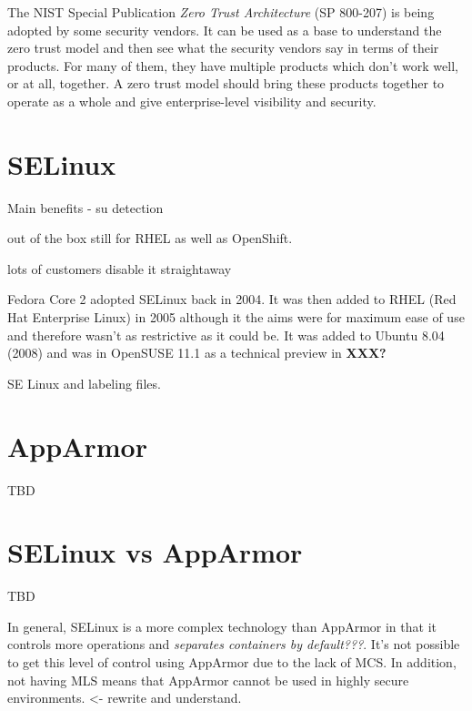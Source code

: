 The NIST Special Publication \textit{Zero Trust Architecture} (SP 800-207) is being adopted by some security vendors. It can be used as a base to understand the zero trust model and then see what the security vendors say in terms of their products. For many of them, they have multiple products which don't work well, or at all, together. A zero trust model should bring these products together to operate as a whole and give enterprise-level visibility and security.

\section{SELinux}\label{selinux}

Main benefits - su detection

out of the box still for RHEL as well as OpenShift.

lots of customers disable it straightaway 

Fedora Core 2 adopted SELinux back in 2004. It was then added to RHEL (Red Hat Enterprise Linux) in 2005 although it the aims were for maximum ease of use and therefore wasn't as restrictive as it could be. It was added to Ubuntu 8.04 (2008) and was in OpenSUSE 11.1 as a technical preview in \textbf{XXX?}

SE Linux and labeling files.


\section{AppArmor}

TBD

\section{SELinux vs AppArmor}

TBD



In general, SELinux is a more complex technology than AppArmor in that it controls more operations and \textit{separates containers by default???}. It's not possible to get this level of control using AppArmor due to the lack of MCS. In addition, not having MLS means that AppArmor cannot be used in highly secure environments. <- rewrite and understand.

